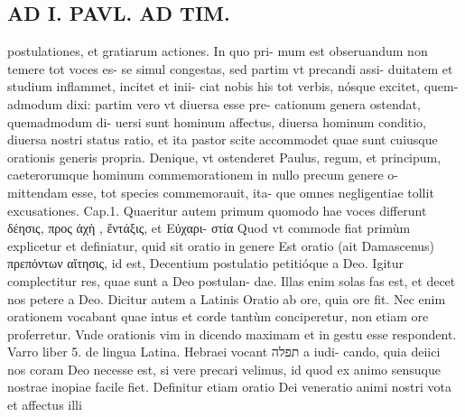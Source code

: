\documentclass{article}
\begin{document}
\begin{pages}
\section*{AD I. PAVL. AD TIM. }
\marginpar{[ p.42 ]}\pstart postulationes, et gratiarum actiones. In quo pri- mum est obseruandum non temere tot voces es- se simul congestas, sed partim vt precandi assi- duitatem et studium inflammet, incitet et inii- ciat nobis his tot verbis, nósque excitet, quem- admodum dixi: partim vero vt diuersa esse pre- cationum genera ostendat, quemadmodum di- uersi sunt hominum affectus, diuersa hominum conditio, diuersa nostri status ratio, et ita pastor scite accommodet quae sunt cuiusque orationis generis propria. Denique, vt ostenderet Paulus, regum, et principum, caeterorumque hominum commemorationem in nullo precum genere o- mittendam esse, tot species commemorauit, ita- que omnes negligentiae tollit excusationes.  \pend\pstart Cap.1. Quaeritur autem primum quomodo hae voces differunt δέησις, προς ἀχὴ  , ἔντάξις, et Εὐχαρι- στία Quod vt commode fiat primùm explicetur et definiatur, quid sit oratio in genere  \pend\pstart Est oratio (ait Damascenus) πρεπόντων αἴτησις, id est, Decentium postulatio petitióque a Deo. Igitur complectitur res, quae sunt a Deo postulan- dae. Illas enim solas fas est, et decet nos petere a Deo. Dicitur autem a Latinis Oratio ab ore, quia ore fit. Nec enim orationem vocabant quae intus et corde tantùm conciperetur, non etiam ore proferretur. Vnde orationis vim in dicendo maximam et in gestu esse respondent. Varro liber  5. de lingua Latina. Hebraei vocant תפלה a iudi- cando, quia deiici nos coram Deo necesse est, si vere precari velimus, id quod ex animo sensuque  nostrae inopiae facile fiet. Definitur etiam oratio Dei veneratio animi nostri vota et affectus illi  \pend

\end{pages}
\end{document}
